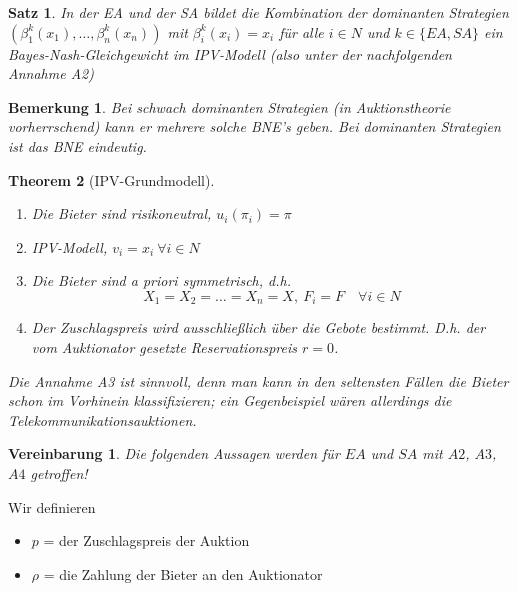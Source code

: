 \documentclass[12pt]{extreport} %
\theoremstyle{named}
\newtheorem{unnamedtheorem}{Theorem} \counterwithin{unnamedtheorem}{chapter}
\theoremstyle{itshape}
\newtheorem{satz}[unnamedtheorem]{Satz}
\theoremstyle{normal}
\newtheorem*{bemerkung}{Bemerkung}
\newtheorem*{vereinbarung}{Vereinbarung}
\begin{document}
\begin{satz}
	In der EA und der SA bildet die Kombination der dominanten Strategien $\left(\beta_{1}^{k}(x_{1}), \dotsc, \beta_{n}^{k}(x_{n}) \right)$ mit $\beta_{i}^{k}(x_{i}) = x_{i}$ für alle $i \in N$ und $k \in \{ EA, SA \}$ ein Bayes-Nash-Gleichgewicht im IPV-Modell (also unter der nachfolgenden Annahme A2)
\end{satz}

\begin{bemerkung}
	Bei schwach dominanten Strategien (in Auktionstheorie vorherrschend) kann er mehrere solche BNE's geben. Bei dominanten Strategien ist das BNE eindeutig.	
\end{bemerkung}

  
\begin{unnamedtheorem}[IPV-Grundmodell] ~\
	\begin{enumerate}
		\item[\hspace{0.5cm}A1:] Die Bieter sind risikoneutral, $u_{i}(\pi_{i}) = \pi$
		\item[\hspace{0.5cm}A2:] IPV-Modell, $v_{i} = x_{i} ~\forall i \in N$
		\item[\hspace{0.5cm}A3:] Die Bieter sind a priori symmetrisch, d.h.
			$$ X_{1} = X_{2} = \dotsc = X_{n} = X, ~F_{i} = F \quad \forall i \in N $$
		\item[\hspace{0.25cm}A4:] Der Zuschlagspreis wird ausschließlich über die Gebote bestimmt. D.h. der vom Auktionator gesetzte Reservationspreis $r = 0$.
	\end{enumerate}
	Die Annahme A3 ist sinnvoll, denn man kann in den seltensten Fällen die Bieter schon im Vorhinein klassifizieren; ein Gegenbeispiel wären allerdings die Telekommunikationsauktionen.
\end{unnamedtheorem}

\begin{vereinbarung}
	Die folgenden Aussagen werden für $EA$ und $SA$ mit $A2$, $A3$, $A4$ getroffen!
\end{vereinbarung}

Wir definieren
\begin{itemize}
	\item $p$ = der Zuschlagspreis der Auktion
	\item $\rho$ = die Zahlung der Bieter an den Auktionator
\end{itemize}
\end{document}
